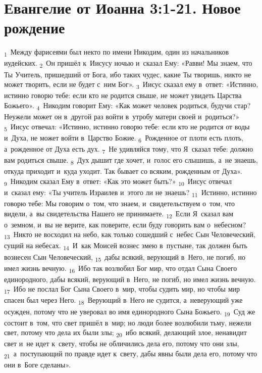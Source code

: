 \documentclass[a4paper,12pt]{article}
\begin{document}

\section{Евангелие от Иоанна 3:1-21. Новое рождение}

\textsubscript{1}~Между фарисеями был некто по имени Никодим, один из начальников иудейских. \textsubscript{2}~Он пришёл к~Иисусу ночью и~сказал Ему: «Равви! Мы знаем, что Ты Учитель, пришедший от Бога, ибо таких чудес, какие Ты творишь, никто не может творить, если не будет с~ним Бог». \textsubscript{3}~Иисус сказал ему в~ответ: «Истинно, истинно говорю тебе: если кто не родится свыше, не может увидеть Царства Божьего». \textsubscript{4}~Никодим говорит Ему: «Как может человек родиться, будучи стар? Неужели может он в~другой раз войти в~утробу матери своей и~родиться?» \textsubscript{5}~Иисус отвечал: «Истинно, истинно говорю тебе: если кто не родится от воды и~Духа, не может войти в~Царство Божие. \textsubscript{6}~Рожденное от плоти есть плоть, а~рожденное от Духа есть дух. \textsubscript{7}~Не удивляйся тому, что Я~сказал тебе: должно вам родиться свыше. \textsubscript{8}~Дух дышит где хочет, и~голос его слышишь, а~не знаешь, откуда приходит и~куда уходит. Так бывает со всяким, рожденным от Духа». \textsubscript{9}~Никодим сказал Ему в~ответ: «Как это может быть?» \textsubscript{10}~Иисус отвечал и~сказал ему: «Ты учитель Израилев и~этого ли не знаешь? \textsubscript{11}~Истинно, истинно говорю тебе: Мы говорим о~том, что знаем, и~свидетельствуем о~том, что видели, а~вы свидетельства Нашего не принимаете. \textsubscript{12}~Если Я~сказал вам о~земном, и~вы не верите, как поверите, если буду говорить вам о~небесном? \textsubscript{13}~Никто не восходил на небо, как только сошедший с~небес Сын Человеческий, сущий на небесах. \textsubscript{14}~И~как Моисей вознес змею в~пустыне, так должен быть вознесен Сын Человеческий, \textsubscript{15}~дабы всякий, верующий в~Него, не погиб, но имел жизнь вечную. \textsubscript{16}~Ибо так возлюбил Бог мир, что отдал Сына Своего единородного, дабы всякий, верующий в~Него, не погиб, но имел жизнь вечную. \textsubscript{17}~Ибо не послал Бог Сына Своего в~мир, чтобы судить мир, но чтобы мир спасен был через Него. \textsubscript{18}~Верующий в~Него не судится, а~неверующий уже осужден, потому что не уверовал во имя единородного Сына Божьего. \textsubscript{19}~Суд же состоит в~том, что свет пришёл в~мир; но люди более возлюбили тьму, нежели свет, потому что дела их были злы; \textsubscript{20}~ибо всякий, делающий злое, ненавидит свет и~не идет к~свету, чтобы не обличились дела его, потому что они злы, \textsubscript{21}~а~поступающий по правде идет к~свету, дабы явны были дела его, потому что они в~Боге сделаны».
\end{document}
